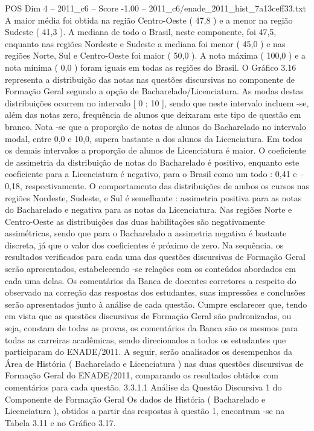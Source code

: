 \begin{textsample}{POS Dim 4 – 2011\_c6 – Score -1.00 – 2011\_c6/enade\_2011\_hist\_7a13ceff33.txt}
A maior média foi obtida na região Centro-Oeste ( 47,8 ) e a menor na região Sudeste ( 41,3 ).
A mediana de todo o Brasil, neste componente, foi 47,5, enquanto nas regiões Nordeste e Sudeste a mediana foi menor ( 45,0 ) e nas regiões Norte, Sul e Centro-Oeste foi maior ( 50,0 ).
A nota máxima ( 100,0 ) e a nota mínima ( 0,0 ) foram iguais em todas as regiões do Brasil.
O Gráfico 3.16 representa a distribuição das notas nas questões discursivas no componente de Formação Geral segundo a opção de Bacharelado/Licenciatura.
As modas destas distribuições ocorrem no intervalo [ 0 ; 10 ], sendo que neste intervalo incluem -se, além das notas zero, frequência de alunos que deixaram este tipo de questão em branco.
Nota -se que a proporção de notas de alunos do Bacharelado no intervalo modal, entre 0,0 e 10,0, supera bastante a dos alunos da Licenciatura.
Em todos os demais intervalos a proporção de alunos de Licenciatura é maior.
O coeficiente de assimetria da distribuição de notas do Bacharelado é positivo, enquanto este coeficiente para a Licenciatura é negativo, para o Brasil como um todo : 0,41 e – 0,18, respectivamente.
O comportamento das distribuições de ambos os cursos nas regiões Nordeste, Sudeste, e Sul é semelhante : assimetria positiva para as notas do Bacharelado e negativa para as notas da Licenciatura.
Nas regiões Norte e Centro-Oeste as distribuições das duas habilitações são negativamente assimétricas, sendo que para o Bacharelado a assimetria negativa é bastante discreta, já que o valor dos coeficientes é próximo de zero.
Na sequência, os resultados verificados para cada uma das questões discursivas de Formação Geral serão apresentados, estabelecendo -se relações com os conteúdos abordados em cada uma delas.
Os comentários da Banca de docentes corretores a respeito do observado na correção das respostas dos estudantes, suas impressões e conclusões serão apresentados junto à análise de cada questão.
Cumpre esclarecer que, tendo em vista que as questões discursivas de Formação Geral são padronizadas, ou seja, constam de todas as provas, os comentários da Banca são os mesmos para todas as carreiras acadêmicas, sendo direcionados a todos os estudantes que participaram do ENADE/2011.
A seguir, serão analisados os desempenhos da Área de História ( Bacharelado e Licenciatura ) nas duas questões discursivas de Formação Geral do ENADE/2011, comparando os resultados obtidos com comentários para cada questão. 3.3.1.1 Análise da Questão Discursiva 1 do Componente de Formação Geral Os dados de História ( Bacharelado e Licenciatura ), obtidos a partir das respostas à questão 1, encontram -se na Tabela 3.11 e no Gráfico 3.17.

\end{textsample}

